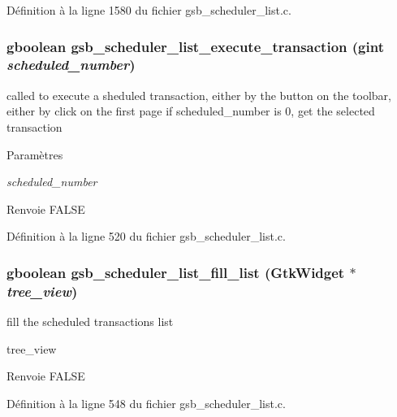 Définition à la ligne 1580 du fichier gsb\_\-scheduler\_\-list.c.

\subsubsection[{gsb\_\-scheduler\_\-list\_\-execute\_\-transaction}]{\setlength{\rightskip}{0pt plus 5cm}gboolean gsb\_\-scheduler\_\-list\_\-execute\_\-transaction (gint {\em scheduled\_\-number})}\label{gsb__scheduler__list_8c_aecc0e9467fcae670ba2243053ce56334}
called to execute a sheduled transaction, either by the button on the toolbar, either by click on the first page if scheduled\_\-number is 0, get the selected transaction


\begin{DoxyParams}{Paramètres}
\item[{\em scheduled\_\-number}]\end{DoxyParams}
\begin{DoxyReturn}{Renvoie}
FALSE 
\end{DoxyReturn}


Définition à la ligne 520 du fichier gsb\_\-scheduler\_\-list.c.

\subsubsection[{gsb\_\-scheduler\_\-list\_\-fill\_\-list}]{\setlength{\rightskip}{0pt plus 5cm}gboolean gsb\_\-scheduler\_\-list\_\-fill\_\-list (GtkWidget $\ast$ {\em tree\_\-view})}\label{gsb__scheduler__list_8c_a09e95845b5893d975e94605f02051651}
fill the scheduled transactions list

tree\_\-view

\begin{DoxyReturn}{Renvoie}
FALSE 
\end{DoxyReturn}


Définition à la ligne 548 du fichier gsb\_\-scheduler\_\-list.c.

